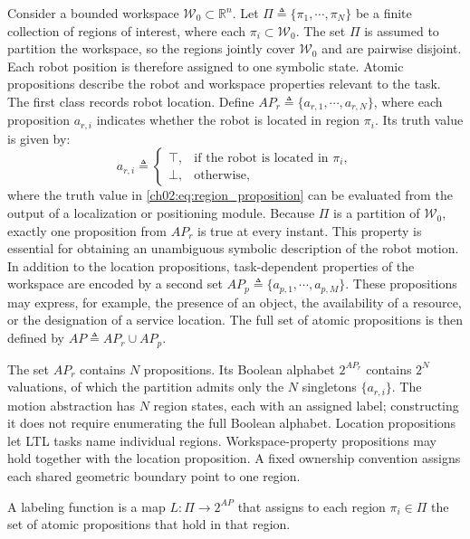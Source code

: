 Consider a bounded workspace
$\mathcal{W}_0 \subset \mathbb{R}^{n}$.
Let
$\Pi \triangleq \{\pi_1,\cdots,\pi_N\}$
be a finite collection of regions of interest, where each
$\pi_i \subset \mathcal{W}_0$.
The set $\Pi$ is assumed to partition the workspace, so the regions jointly
cover $\mathcal{W}_0$ and are pairwise disjoint. Each robot position is
therefore assigned to one symbolic state. Atomic propositions describe the
robot and workspace properties relevant to the task. The first class records
robot location. Define
$AP_r \triangleq \{a_{r,1},\cdots,a_{r,N}\}$,
where each proposition $a_{r,i}$ indicates whether the robot is located in
region $\pi_i$. Its truth value is given by:
\begin{equation}
a_{r,i} \triangleq
\begin{cases}
\top, & \text{if the robot is located in } \pi_i, \\
\bot, & \text{otherwise},
\end{cases}
\label{ch02:eq:region_proposition}
\end{equation}
where the truth value in \eqref{ch02:eq:region_proposition} can be evaluated
from the output of a localization or positioning module.
Because $\Pi$ is a partition of $\mathcal{W}_0$, exactly one proposition from
$AP_r$ is true at every instant. This property is essential for obtaining an
unambiguous symbolic description of the robot motion. In addition to the
location propositions, task-dependent properties of the workspace are encoded by
a second set
$AP_p \triangleq \{a_{p,1},\cdots,a_{p,M}\}$.
These propositions may express, for example, the presence of an object, the
availability of a resource, or the designation of a service location. The full
set of atomic propositions is then defined by
$AP \triangleq AP_r \cup AP_p$.

\begin{revision}
The set $AP_r$ contains $N$ propositions. Its Boolean alphabet $2^{AP_r}$
contains $2^N$ valuations, of which the partition admits only the $N$
singletons $\{a_{r,i}\}$. The motion abstraction has $N$ region states,
each with an assigned label; constructing it does not require enumerating
the full Boolean alphabet. Location propositions let LTL tasks name
individual regions. Workspace-property propositions may hold together
with the location proposition. A fixed ownership convention assigns each
shared geometric boundary point to one region.
\end{revision}

\begin{definition}
\label{ch02:def:labeling}
A labeling function is a map
$L : \Pi \to 2^{AP}$
that assigns to each region $\pi_i \in \Pi$ the set of atomic propositions that
hold in that region. 
\end{definition}

